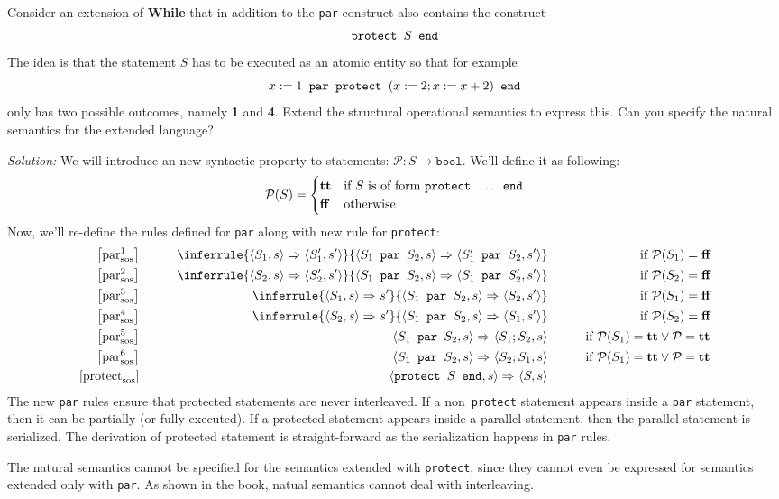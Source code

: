 Consider an extension of \textbf{While} that in addition to the \texttt{par} construct also contains the construct
\begin{equation*}
	\texttt{protect } S \texttt{ end}
\end{equation*}
The idea is that the statement $ S $ has to be executed as an atomic entity so that for example
\begin{equation}
	x:=1 \texttt{ par } \texttt{protect } (x:=2; x:=x+2) \texttt{ end}
\end{equation}
only has two possible outcomes, namely \textbf{1} and \textbf{4}. Extend the structural operational semantics to express this. Can you specify the natural semantics for the extended language?

\textit{Solution:} We will introduce an new syntactic property to statements: $ \mathcal{P} : S \rightarrow \texttt{bool}$. We'll define it as following:
\begin{align*}
	\mathcal{P}(S) = \begin{cases}
	\textbf{tt} & \text{if $S$ is of form $\texttt{protect } \ldots \texttt{ end}$}  \\
	\textbf{ff} & \text{otherwise}
	\end{cases}
\end{align*}
Now, we'll re-define the rules defined for \texttt{par} along with new rule for \texttt{protect}:
\begin{align*}
	\sosrule[1]{par} & \qquad &
	\inferrule
		{\sostrans{S_1}{s}{S_1^\prime}{s^\prime}}
		{\sostrans{\spar{S_1}{S_2}}{s}{\spar{S_1^\prime}{S_2}}{s^\prime}}
	& \qquad & \text{if } \mathcal{P}(S_1) = \false \\
	\sosrule[2]{par} & &
	\inferrule
		{\sostrans{S_2}{s}{S_2^\prime}{s^\prime}}
		{\sostrans{\spar{S_1}{S_2}}{s}{\spar{S_1}{S_2^\prime}}{s^\prime}}
	& &\text{if } \mathcal{P}(S_2) = \false \\
	\sosrule[3]{par} & \qquad &
	\inferrule
		{\sosftrans{S_1}{s}{s^\prime}}
		{\sostrans{\spar{S_1}{S_2}}{s}{S_2}{s^\prime}}
	& \qquad & \text{if } \mathcal{P}(S_1) = \false \\
	\sosrule[4]{par} & &
	\inferrule
		{\sosftrans{S_2}{s}{s^\prime}}
		{\sostrans{\spar{S_1}{S_2}}{s}{S_1}{s^\prime}}
	& &\text{if } \mathcal{P}(S_2) = \false \\
	\sosrule[5]{par} & &
	\sostrans{\spar{S_1}{S_2}}{s}{S_1;S_2}{s}
	& & \text{if } \mathcal{P}(S_1) = \true \vee \mathcal{P} = \true \\
	\sosrule[6]{par} & &
	\sostrans{\spar{S_1}{S_2}}{s}{S_2;S_1}{s}
	& & \text{if } \mathcal{P}(S_1) = \true \vee \mathcal{P} = \true \\
	\sosrule{protect} & &
	\sostrans{\sprotect{S}}{s}{S}{s}
	& &
\end{align*}
The new \texttt{par} rules ensure that protected statements are never interleaved. If a non~\texttt{protect} statement appears inside a \texttt{par} statement, then it can be partially (or fully executed). If a protected statement appears inside a parallel statement, then the parallel statement is serialized. The derivation of protected statement is straight-forward as the serialization happens in \texttt{par} rules.

The natural semantics cannot be specified for the semantics extended with \texttt{protect}, since they cannot even be expressed for semantics extended only with \texttt{par}. As shown in the book, natual semantics cannot deal with interleaving.